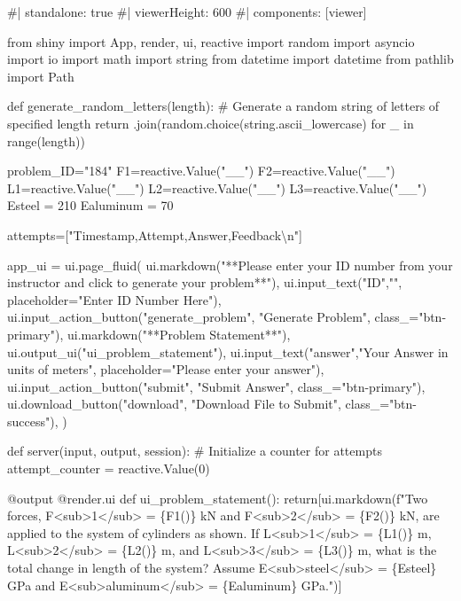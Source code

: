 \documentclass[
  letterpaper,
  DIV=11,
  numbers=noendperiod]{scrreprt}
\newenvironment{Shaded}{\begin{snugshade}}{\end{snugshade}}
\newcommand{\NormalTok}[1]{\textcolor[rgb]{0.00,0.23,0.31}{#1}}
\begin{document}
\begin{Shaded}
\begin{Highlighting}[]
\NormalTok{\#| standalone: true}
\NormalTok{\#| viewerHeight: 600}
\NormalTok{\#| components: [viewer]}

\NormalTok{from shiny import App, render, ui, reactive}
\NormalTok{import random}
\NormalTok{import asyncio}
\NormalTok{import io}
\NormalTok{import math}
\NormalTok{import string}
\NormalTok{from datetime import datetime}
\NormalTok{from pathlib import Path}

\NormalTok{def generate\_random\_letters(length):}
\NormalTok{    \# Generate a random string of letters of specified length}
\NormalTok{    return \textquotesingle{}\textquotesingle{}.join(random.choice(string.ascii\_lowercase) for \_ in range(length)) }

\NormalTok{problem\_ID="184"}
\NormalTok{F1=reactive.Value("\_\_")}
\NormalTok{F2=reactive.Value("\_\_")}
\NormalTok{L1=reactive.Value("\_\_")}
\NormalTok{L2=reactive.Value("\_\_")}
\NormalTok{L3=reactive.Value("\_\_")}
\NormalTok{Esteel = 210}
\NormalTok{Ealuminum = 70}



\NormalTok{attempts=["Timestamp,Attempt,Answer,Feedback\textbackslash{}n"]}

\NormalTok{app\_ui = ui.page\_fluid(}
\NormalTok{    ui.markdown("**Please enter your ID number from your instructor and click to generate your problem**"),}
\NormalTok{    ui.input\_text("ID","", placeholder="Enter ID Number Here"),}
\NormalTok{    ui.input\_action\_button("generate\_problem", "Generate Problem", class\_="btn{-}primary"),}
\NormalTok{    ui.markdown("**Problem Statement**"),}
\NormalTok{    ui.output\_ui("ui\_problem\_statement"),}
\NormalTok{    ui.input\_text("answer","Your Answer in units of meters", placeholder="Please enter your answer"),}
\NormalTok{    ui.input\_action\_button("submit", "Submit Answer", class\_="btn{-}primary"),}
\NormalTok{    ui.download\_button("download", "Download File to Submit", class\_="btn{-}success"),}
\NormalTok{)}


\NormalTok{def server(input, output, session):}
\NormalTok{    \# Initialize a counter for attempts}
\NormalTok{    attempt\_counter = reactive.Value(0)}

\NormalTok{    @output}
\NormalTok{    @render.ui}
\NormalTok{    def ui\_problem\_statement():}
\NormalTok{        return[ui.markdown(f"Two forces, F\textless{}sub\textgreater{}1\textless{}/sub\textgreater{} = \{F1()\} kN and F\textless{}sub\textgreater{}2\textless{}/sub\textgreater{} = \{F2()\} kN, are applied to the system of cylinders as shown. If L\textless{}sub\textgreater{}1\textless{}/sub\textgreater{} = \{L1()\} m, L\textless{}sub\textgreater{}2\textless{}/sub\textgreater{} = \{L2()\} m, and L\textless{}sub\textgreater{}3\textless{}/sub\textgreater{} = \{L3()\} m, what is the total change in length of the system? Assume E\textless{}sub\textgreater{}steel\textless{}/sub\textgreater{} = \{Esteel\} GPa and E\textless{}sub\textgreater{}aluminum\textless{}/sub\textgreater{} = \{Ealuminum\} GPa.")]}
    

\end{Highlighting}
\end{Shaded}
\end{document}
